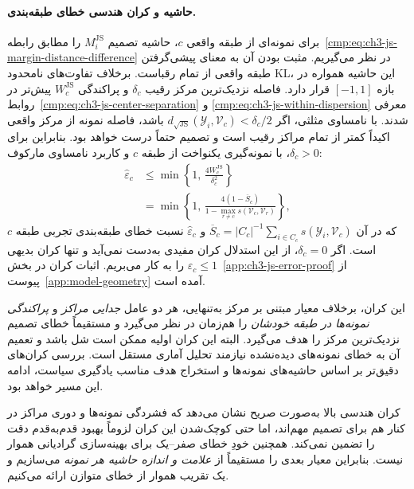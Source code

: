 \paragraph{حاشیه و کران هندسی خطای طبقه‌بندی.}
برای نمونه‌ای از طبقه واقعی $c$، حاشیه تصمیم $M_i^{\mathrm{JS}}$ را مطابق رابطه~\eqref{cmp:eq:ch3-js-margin-distance-difference} در نظر می‌گیریم. مثبت بودن آن به معنای پیشی‌گرفتن طبقه واقعی از تمام رقباست. برخلاف تفاوت‌های نامحدود KL، این حاشیه همواره در بازه $[-1,1]$ قرار دارد. فاصله نزدیک‌ترین مرکز رقیب $\delta_c$ و پراکندگی $W_c^{\mathrm{JS}}$ پیش‌تر در روابط~\eqref{cmp:eq:ch3-js-center-separation} و \eqref{cmp:eq:ch3-js-within-dispersion} معرفی شدند. با نامساوی مثلثی، اگر $d_{\sqrt{\mathrm{JS}}}(\mathscr Y_i,\mathcal V_c)<\delta_c/2$ باشد، فاصله نمونه از مرکز واقعی اکیداً کمتر از تمام مراکز رقیب است و تصمیم حتماً درست خواهد بود. بنابراین برای $\delta_c>0$، با نمونه‌گیری یکنواخت از طبقه $c$ و کاربرد نامساوی مارکوف:
\begin{equation}\label{cmp:eq:ch3-js-class-error-bound}
\boxed{
\begin{aligned}
\widehat\varepsilon_c
&\le\min\left\{1,\,
\frac{4W_c^{\mathrm{JS}}}{\delta_c^2}\right\}\\
&=\min\left\{1,\,
\frac{4\left(1-\overline S_c\right)}
{1-\max_{r\ne c}s(\mathcal V_c,\mathcal V_r)}\right\},
\end{aligned}}
\end{equation}
که در آن $\overline S_c=|C_c|^{-1}\sum_{i\in C_c}s(\mathscr Y_i,\mathcal V_c)$ و $\widehat\varepsilon_c$ نسبت خطای طبقه‌بندی تجربی طبقه $c$ است. اگر $\delta_c=0$، از این استدلال کران مفیدی به‌دست نمی‌آید و تنها کران بدیهی $\widehat\varepsilon_c\le1$ را به کار می‌بریم. اثبات کران در بخش~\ref{app:ch3-js-error-proof} از پیوست~\ref{app:model-geometry} آمده است.

این کران، برخلاف معیار مبتنی بر مرکز به‌تنهایی، هر دو عامل \emph{جدایی مراکز} و \emph{پراکندگی نمونه‌ها در طبقه خودشان} را هم‌زمان در نظر می‌گیرد و مستقیماً خطای تصمیم نزدیک‌ترین مرکز را هدف می‌گیرد. البته این کران اولیه ممکن است شل باشد و تعمیم آن به خطای نمونه‌های دیده‌نشده نیازمند تحلیل آماری مستقل است. بررسی کران‌های دقیق‌تر بر اساس حاشیه‌های نمونه‌ها و استخراج هدف مناسب یادگیری سیاست، ادامه این مسیر خواهد بود.

کران هندسی بالا به‌صورت صریح نشان می‌دهد
که فشردگی نمونه‌ها و دوری مراکز در کنار هم
برای تصمیم مهم‌اند، اما حتی کوچک‌شدن این کران
لزوماً بهبود قدم‌به‌قدم دقت را تضمین نمی‌کند.
همچنین خودِ خطای صفر--یک برای بهینه‌سازی
گرادیانی هموار نیست. بنابراین معیار بعدی را
مستقیماً از \emph{علامت و اندازه حاشیه هر نمونه}
می‌سازیم و یک تقریب هموار از خطای متوازن ارائه می‌کنیم.


